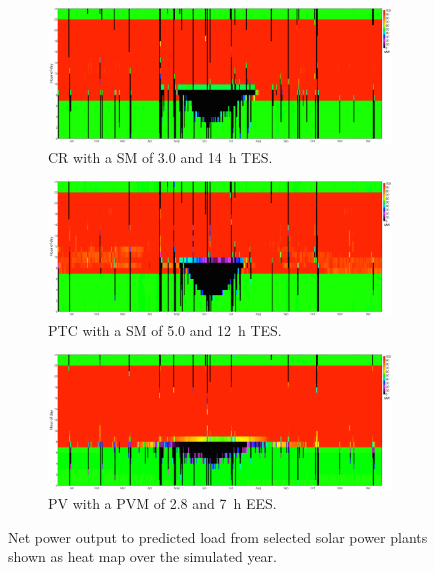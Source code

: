 \begin{figure}[!htbp]
        \centering   
        \begin{subfigure}[b]{1\textwidth}
                \centering
                \includegraphics[width=1\textwidth]{FIG/HeatmapCR}
                \caption{CR with a SM of \num{3.0} and \SI{14}{h} TES.}\label{HeatmapCR}
        \end{subfigure}
        
\par\medskip %

        \begin{subfigure}[b]{1\textwidth}
                \centering
                \includegraphics[width=1\textwidth]{FIG/HeatmapPTC}
                \caption{PTC with a SM of \num{5.0} and \SI{12}{h} TES.}\label{HeatmapPTC}
        \end{subfigure}
        
\par\medskip %
           
        \begin{subfigure}[b]{1\textwidth}
                \centering
                \includegraphics[width=1\textwidth]{FIG/HeatmapPV}
                \caption{PV with a PVM of \num{2.8} and \SI{7}{h} EES.}\label{HeatmapPV}
        \end{subfigure}
        \caption{Net power output to predicted load from selected solar power plants shown as heat map over the simulated year.}\label{Heatmap}
\end{figure}

